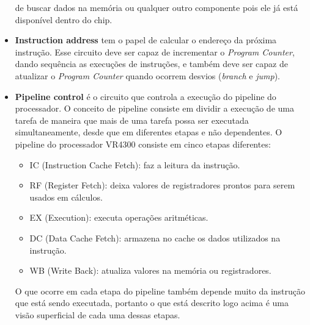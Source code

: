\documentclass[12pt]{article}
\begin{document}
\begin{itemize}
de buscar dados na memória ou qualquer outro componente pois ele já
está disponível dentro do chip.
    \item {\bf Instruction address} tem o papel de calcular o endereço
da próxima instrução. Esse circuito deve ser capaz de incrementar o
{\em Program Counter}, dando sequência as execuções de instruções, e
também deve ser capaz de atualizar o {\em Program Counter} quando
ocorrem desvios ({\em branch} e {\em jump}).
    \item {\bf Pipeline control} é o circuito que controla a execução
do pipeline do processador. O conceito de pipeline consiste em dividir
a execução de uma tarefa de maneira que mais de uma tarefa possa ser
executada simultaneamente, desde que em diferentes etapas e não 
dependentes. O pipeline do processador VR4300 consiste em cinco etapas
diferentes:
    \begin{itemize}
        \item{IC (Instruction Cache Fetch):} faz a leitura da instrução.
        \item{RF (Register Fetch):} deixa valores de registradores 
prontos para serem usados em cálculos.
        \item{EX (Execution):} executa operações aritméticas.
        \item{DC (Data Cache Fetch):} armazena no cache os dados 
utilizados na instrução.
        \item{WB (Write Back):} atualiza valores na memória ou 
registradores.
    \end{itemize}
O que ocorre em cada etapa do pipeline também depende muito da instrução
que está sendo executada, portanto o que está descrito logo acima é uma
visão superficial de cada uma dessas etapas.
\end{itemize}
\end{document}
